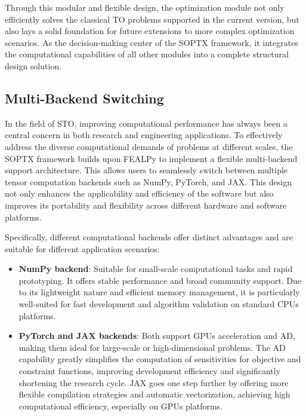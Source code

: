 \documentclass[mathpazo]{cicp}
\begin{document}
Through this modular and flexible design, the optimization module not only efficiently solves the classical TO problems supported in the current version, but also lays a solid foundation for future extensions to more complex optimization scenarios. As the decision-making center of the SOPTX framework, it integrates the computational capabilities of all other modules into a complete structural design solution.

\subsection{Multi-Backend Switching}
In the field of STO, improving computational performance has always been a central concern in both research and engineering applications. To effectively address the diverse computational demands of problems at different scales, the SOPTX framework builds upon FEALPy to implement a flexible multi-backend support architecture. This allows users to seamlessly switch between multiple tensor computation backends such as NumPy, PyTorch, and JAX. This design not only enhances the applicability and efficiency of the software but also improves its portability and flexibility across different hardware and software platforms. 

Specifically, different computational backends offer distinct advantages and are suitable for different application scenarios: 
\begin{itemize} 
	\item \textbf{NumPy backend}: Suitable for small-scale computational tasks and rapid prototyping. It offers stable performance and broad community support. Due to its lightweight nature and efficient memory management, it is particularly well-suited for fast development and algorithm validation on standard CPUs platforms.
	\item \textbf{PyTorch and JAX backends}: Both support GPUs acceleration and AD, making them ideal for large-scale or high-dimensional problems. The AD capability greatly simplifies the computation of sensitivities for objective and constraint functions, improving development efficiency and significantly shortening the research cycle. JAX goes one step further by offering more flexible compilation strategies and automatic vectorization, achieving high computational efficiency, especially on GPUs platforms.
\end{itemize}
\end{document}
